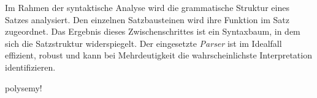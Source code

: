 \par
Im Rahmen der syntaktische Analyse wird die grammatische Struktur eines Satzes analysiert. Den einzelnen Satzbausteinen wird ihre Funktion im Satz zugeordnet. Das Ergebnis dieses Zwischenschrittes ist ein Syntaxbaum, in dem sich die Satzstruktur widerspiegelt. Der eingesetzte \textit{Parser} ist im Idealfall effizient, robust und kann bei Mehrdeutigkeit die wahrscheinlichste Interpretation identifizieren.
\par

polysemy!












